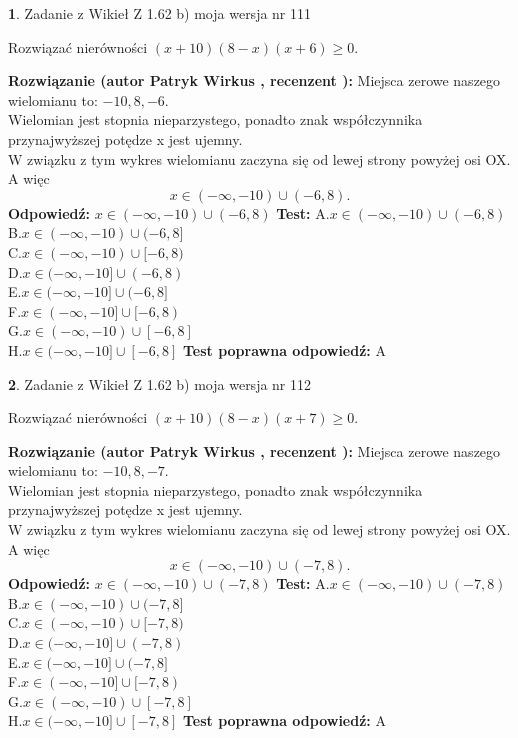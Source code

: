 \documentclass[12pt, a4paper]{article}
\theoremstyle{definition} %
\newtheorem{zad}{}
\newcommand{\zadStart}[1]{\begin{zad}#1\newline}
\newcommand{\zadStop}{\end{zad}}
\newcommand{\rozwStart}[2]{\noindent \textbf{Rozwiązanie (autor #1 , recenzent #2): }\newline}
\newcommand{\rozwStop}{\newline}
\newcommand{\odpStart}{\noindent \textbf{Odpowiedź:}\newline}
\newcommand{\odpStop}{\newline}
\newcommand{\testStart}{\noindent \textbf{Test:}\newline}
\newcommand{\testStop}{\newline}
\newcommand{\kluczStart}{\noindent \textbf{Test poprawna odpowiedź:}\newline}
\newcommand{\kluczStop}{\newline}
\begin{document}
\zadStart{Zadanie z Wikieł Z 1.62 b) moja wersja nr 111}

Rozwiązać nierówności $(x+10)(8-x)(x+6)\ge0$.
\zadStop
\rozwStart{Patryk Wirkus}{}
Miejsca zerowe naszego wielomianu to: $-10, 8, -6$.\\
Wielomian jest stopnia nieparzystego, ponadto znak współczynnika przy\linebreak najwyższej potędze x jest ujemny.\\ W związku z tym wykres wielomianu zaczyna się od lewej strony powyżej osi OX. A więc $$x \in (-\infty,-10) \cup (-6,8).$$
\rozwStop
\odpStart
$x \in (-\infty,-10) \cup (-6,8)$
\odpStop
\testStart
A.$x \in (-\infty,-10) \cup (-6,8)$\\
B.$x \in (-\infty,-10) \cup (-6,8]$\\
C.$x \in (-\infty,-10) \cup [-6,8)$\\
D.$x \in (-\infty,-10] \cup (-6,8)$\\
E.$x \in (-\infty,-10] \cup (-6,8]$\\
F.$x \in (-\infty,-10] \cup [-6,8)$\\
G.$x \in (-\infty,-10) \cup [-6,8]$\\
H.$x \in (-\infty,-10] \cup [-6,8]$
\testStop
\kluczStart
A
\kluczStop



\zadStart{Zadanie z Wikieł Z 1.62 b) moja wersja nr 112}

Rozwiązać nierówności $(x+10)(8-x)(x+7)\ge0$.
\zadStop
\rozwStart{Patryk Wirkus}{}
Miejsca zerowe naszego wielomianu to: $-10, 8, -7$.\\
Wielomian jest stopnia nieparzystego, ponadto znak współczynnika przy\linebreak najwyższej potędze x jest ujemny.\\ W związku z tym wykres wielomianu zaczyna się od lewej strony powyżej osi OX. A więc $$x \in (-\infty,-10) \cup (-7,8).$$
\rozwStop
\odpStart
$x \in (-\infty,-10) \cup (-7,8)$
\odpStop
\testStart
A.$x \in (-\infty,-10) \cup (-7,8)$\\
B.$x \in (-\infty,-10) \cup (-7,8]$\\
C.$x \in (-\infty,-10) \cup [-7,8)$\\
D.$x \in (-\infty,-10] \cup (-7,8)$\\
E.$x \in (-\infty,-10] \cup (-7,8]$\\
F.$x \in (-\infty,-10] \cup [-7,8)$\\
G.$x \in (-\infty,-10) \cup [-7,8]$\\
H.$x \in (-\infty,-10] \cup [-7,8]$
\testStop
\kluczStart
A
\kluczStop
\end{document}
